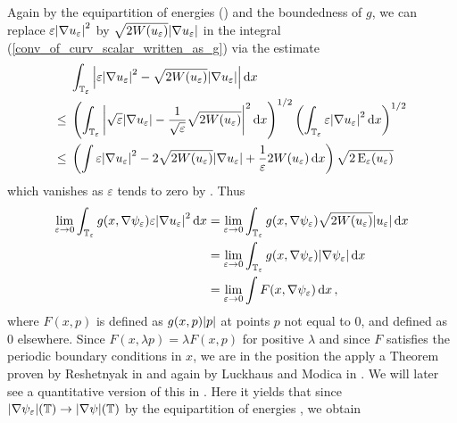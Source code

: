 Again by the equipartition of energies () and the boundedness of $ g $, we can replace $ \varepsilon \abs{ \nabla u_{ \varepsilon } }^{ 2 } $ by $ \sqrt{ 2 W ( u_{ \varepsilon } ) } \abs{ \nabla u_{ \varepsilon } } $ in the integral (\ref{conv_of_curv_scalar_written_as_g}) via the estimate
\begin{align*}
	& \int_{ \operatorname{\mathbb{T}}_{ \varepsilon } }
	\abs{ 
		\varepsilon \abs{ \nabla u_{ \varepsilon } }^{ 2 }
		-
		\sqrt{ 2 W ( u_{ \varepsilon } ) } \abs{ \nabla u_{\varepsilon } }
	}
	\dd{ x }
	\\
	\leq {} &
	\left(
	\int_{ \operatorname{\mathbb{T}}_{ \varepsilon } }
	\abs{ 
		\sqrt{ \varepsilon } \abs{ \nabla u_{ \varepsilon } } 
		- 
		\frac{ 1 }{ \sqrt{ \varepsilon } } \sqrt{ 2 W ( u_{ \varepsilon } ) } 
	}^{ 2 }
	\dd{ x }
	\right)^{ 1/2 }
	\left(
	\int_{ \operatorname{\mathbb{T}}_{ \varepsilon } }
	\varepsilon \abs{ \nabla u_{ \varepsilon } }^{ 2 }
	\dd{ x }
	\right)^{ 1/ 2 }
	\\
	\leq {} &
	\left(
	\int
	\varepsilon \abs{ \nabla u_{ \varepsilon } }^{ 2 }
	-
	2 \sqrt{ 2 W ( u_{ \varepsilon } ) } \abs{ \nabla u_{ \varepsilon } }
	+
	\frac{ 1 }{ \varepsilon }
	2 W ( u_{ \varepsilon } )
	\dd{ x }
	\right)
	\sqrt{ 2 \operatorname{E}_{ \varepsilon } ( u_{ \varepsilon } ) }
\end{align*}
which vanishes as $ \varepsilon $ tends to zero by .
Thus
\begin{align*}
	\lim_{ \varepsilon \to 0 }
	\int_{ \operatorname{\mathbb{T}}_{ \varepsilon } }
	g ( x , \nabla \psi_{ \varepsilon  } )
	\varepsilon \abs{ \nabla u_{ \varepsilon } }^{ 2 }
	\dd{ x }
	& =
	\lim_{ \varepsilon \to 0 }
	\int_{ \operatorname{\mathbb{T}}_{ \varepsilon } }
	g ( x , \nabla \psi_{ \varepsilon  } )
	\sqrt{ 2 W ( u_{ \varepsilon } ) } 
	\abs{ u_{ \varepsilon } }
	\dd{ x }
	\\
	& =
	\lim_{ \varepsilon \to 0 }
	\int_{ \operatorname{\mathbb{T}}_{ \varepsilon } }
	g ( x , \nabla \psi_{ \varepsilon  } ) \abs{ \nabla \psi_{ \varepsilon  } }
	\dd{ x }
	\\
	& = 
	\lim_{ \varepsilon \to 0 }
	\int
	F ( x, \nabla \psi_{ \varepsilon } )
	\dd{ x },
\end{align*}
where $ F ( x, p ) $ is defined as $ g ( x , p ) \abs{ p } $ at points $ p $ not equal to 0, and defined as 0 elsewhere. Since $ F (x , \lambda p ) = \lambda F ( x, p ) $ for positive $ \lambda $ and since $ F $ satisfies the periodic boundary conditions in $ x $, we are in the position the apply a Theorem proven by Reshetnyak in \cite{Reshetnyak_weak_convergence} and again by Luckhaus and Modica in \cite[]{luckhaus_modica_gibbs_thompson_relation}. We will later see a quantitative version of this in . Here it yields that since $ \abs{ \nabla \psi_{ \varepsilon  } } ( \operatorname{\mathbb{T}} ) \to \abs{ \nabla \psi } ( \operatorname{\mathbb{T}} ) $ by the equipartition of energies , we obtain
